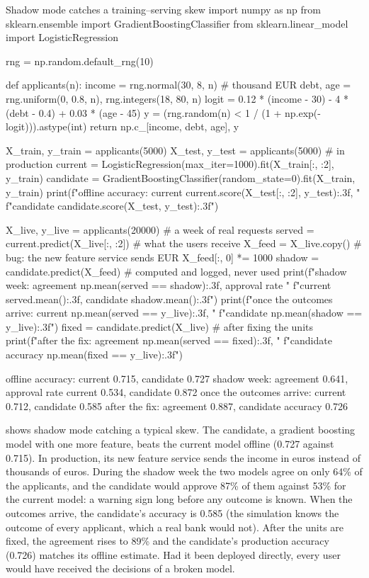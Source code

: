 \begin{pylisting}[label={lst:shadow}]{Shadow mode catches a training--serving skew}
import numpy as np
from sklearn.ensemble import GradientBoostingClassifier
from sklearn.linear_model import LogisticRegression

rng = np.random.default_rng(10)

def applicants(n):
    income = rng.normal(30, 8, n)                    # thousand EUR
    debt, age = rng.uniform(0, 0.8, n), rng.integers(18, 80, n)
    logit = 0.12 * (income - 30) - 4 * (debt - 0.4) + 0.03 * (age - 45)
    y = (rng.random(n) < 1 / (1 + np.exp(-logit))).astype(int)
    return np.c_[income, debt, age], y

X_train, y_train = applicants(5000)
X_test, y_test = applicants(5000)
# in production
current = LogisticRegression(max_iter=1000).fit(X_train[:, :2], y_train)
candidate = GradientBoostingClassifier(random_state=0).fit(X_train, y_train)
print(f"offline accuracy: current {current.score(X_test[:, :2], y_test):.3f}, "
      f"candidate {candidate.score(X_test, y_test):.3f}")

X_live, y_live = applicants(20000)                   # a week of real requests
served = current.predict(X_live[:, :2])              # what the users receive
X_feed = X_live.copy()
# bug: the new feature service sends EUR
X_feed[:, 0] *= 1000
shadow = candidate.predict(X_feed)                   # computed and logged, never used
print(f"shadow week: agreement {np.mean(served == shadow):.3f}, approval rate "
      f"current {served.mean():.3f}, candidate {shadow.mean():.3f}")
print(f"once the outcomes arrive: current {np.mean(served == y_live):.3f}, "
      f"candidate {np.mean(shadow == y_live):.3f}")
fixed = candidate.predict(X_live)                    # after fixing the units
print(f"after the fix: agreement {np.mean(served == fixed):.3f}, "
      f"candidate accuracy {np.mean(fixed == y_live):.3f}")
\end{pylisting}
\begin{pyoutput}
offline accuracy: current 0.715, candidate 0.727
shadow week: agreement 0.641, approval rate current 0.534, candidate 0.872
once the outcomes arrive: current 0.712, candidate 0.585
after the fix: agreement 0.887, candidate accuracy 0.726
\end{pyoutput}

 shows shadow mode catching a typical skew. The candidate, a gradient boosting model with one more
feature, beats the current model offline (0.727 against 0.715). In production, its new feature service sends the income
in euros instead of thousands of euros. During the shadow week the two models agree on only 64\% of the applicants, and
the candidate would approve 87\% of them against 53\% for the current model: a warning sign long before any outcome is known.
When the outcomes arrive, the candidate's accuracy is 0.585 (the simulation knows the outcome of every
applicant, which a real bank would not). After the units are fixed, the agreement rises to 89\% and
the candidate's production accuracy (0.726) matches its offline estimate. Had it been deployed directly, every user
would have received the decisions of a broken model.

